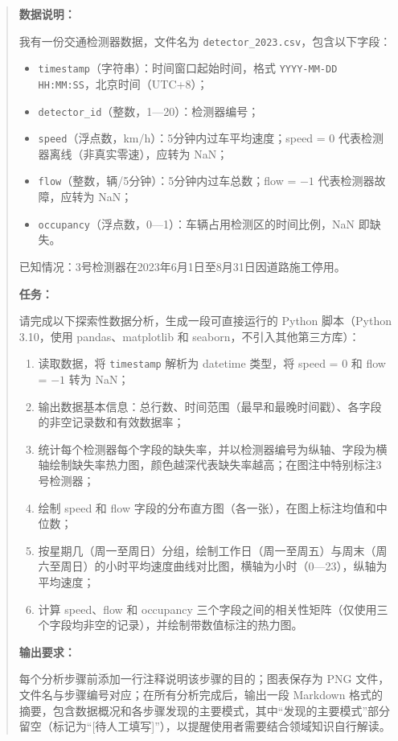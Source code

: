 \begin{quote}
\textbf{数据说明：}

我有一份交通检测器数据，文件名为 \texttt{detector\_2023.csv}，包含以下字段：
\begin{itemize}
  \item \texttt{timestamp}（字符串）：时间窗口起始时间，格式 \texttt{YYYY-MM-DD HH:MM:SS}，北京时间（UTC+8）；
  \item \texttt{detector\_id}（整数，1—20）：检测器编号；
  \item \texttt{speed}（浮点数，km/h）：5分钟内过车平均速度；speed = 0 代表检测器离线（非真实零速），应转为 NaN；
  \item \texttt{flow}（整数，辆/5分钟）：5分钟内过车总数；flow = $-1$ 代表检测器故障，应转为 NaN；
  \item \texttt{occupancy}（浮点数，0—1）：车辆占用检测区的时间比例，NaN 即缺失。
\end{itemize}

已知情况：3号检测器在2023年6月1日至8月31日因道路施工停用。

\textbf{任务：}

请完成以下探索性数据分析，生成一段可直接运行的 Python 脚本（Python 3.10，使用 pandas、matplotlib 和 seaborn，不引入其他第三方库）：

\begin{enumerate}
  \item 读取数据，将 \texttt{timestamp} 解析为 datetime 类型，将 speed = 0 和 flow = $-1$ 转为 NaN；
  \item 输出数据基本信息：总行数、时间范围（最早和最晚时间戳）、各字段的非空记录数和有效数据率；
  \item 统计每个检测器每个字段的缺失率，并以检测器编号为纵轴、字段为横轴绘制缺失率热力图，颜色越深代表缺失率越高；在图注中特别标注3号检测器；
  \item 绘制 speed 和 flow 字段的分布直方图（各一张），在图上标注均值和中位数；
  \item 按星期几（周一至周日）分组，绘制工作日（周一至周五）与周末（周六至周日）的小时平均速度曲线对比图，横轴为小时（0—23），纵轴为平均速度；
  \item 计算 speed、flow 和 occupancy 三个字段之间的相关性矩阵（仅使用三个字段均非空的记录），并绘制带数值标注的热力图。
\end{enumerate}

\textbf{输出要求：}

每个分析步骤前添加一行注释说明该步骤的目的；图表保存为 PNG 文件，文件名与步骤编号对应；在所有分析完成后，输出一段 Markdown 格式的摘要，包含数据概况和各步骤发现的主要模式，其中“发现的主要模式”部分留空（标记为“[待人工填写]”），以提醒使用者需要结合领域知识自行解读。
\end{quote}

